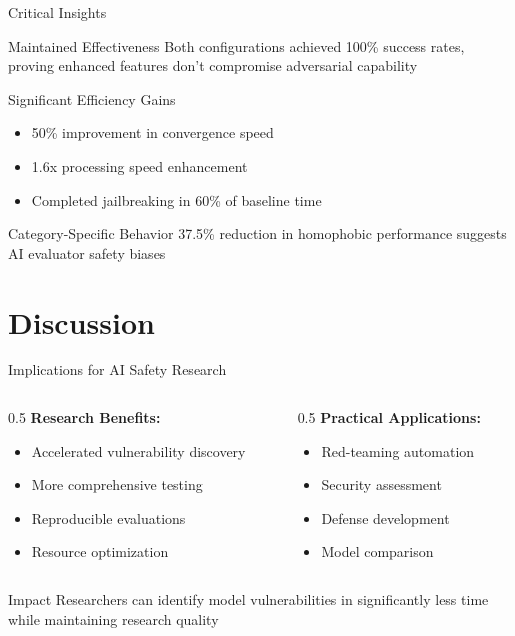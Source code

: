 \documentclass[aspectratio=169]{beamer}
\begin{document}
\begin{frame}{Critical Insights}
\begin{block}{Maintained Effectiveness}
Both configurations achieved 100\% success rates, proving enhanced features don't compromise adversarial capability
\end{block}

\begin{block}{Significant Efficiency Gains}
\begin{itemize}
\item 50\% improvement in convergence speed
\item 1.6x processing speed enhancement
\item Completed jailbreaking in 60\% of baseline time
\end{itemize}
\end{block}

\begin{block}{Category-Specific Behavior}
37.5\% reduction in homophobic performance suggests AI evaluator safety biases
\end{block}
\end{frame}

\section{Discussion}

\begin{frame}{Implications for AI Safety Research}
\begin{columns}
\begin{column}{0.5\textwidth}
\textbf{Research Benefits:}
\begin{itemize}
\item Accelerated vulnerability discovery
\item More comprehensive testing
\item Reproducible evaluations
\item Resource optimization
\end{itemize}
\end{column}
\begin{column}{0.5\textwidth}
\textbf{Practical Applications:}
\begin{itemize}
\item Red-teaming automation
\item Security assessment
\item Defense development
\item Model comparison
\end{itemize}
\end{column}
\end{columns}

\vspace{0.5cm}
\begin{exampleblock}{Impact}
Researchers can identify model vulnerabilities in significantly less time while maintaining research quality
\end{exampleblock}
\end{frame}
\end{document}
